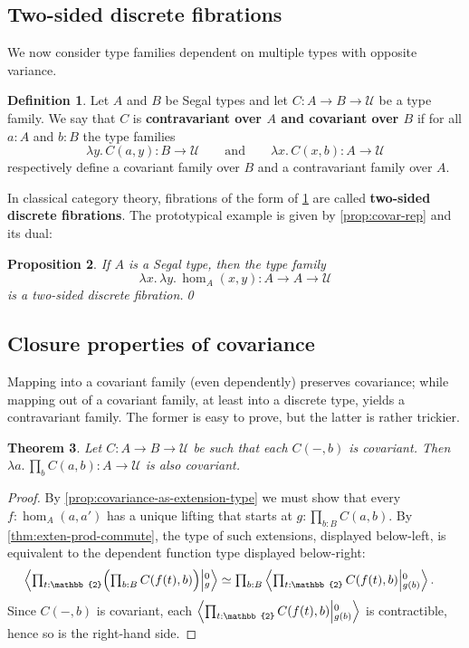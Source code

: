 \documentclass{amsart}
\theoremstyle{plain}
\newtheorem{thm}{Theorem}[section]
\newtheorem{prop}[thm]{Proposition}
\theoremstyle{definition}
\newtheorem{defn}[thm]{Definition}
\theoremstyle{remark}
\numberwithin{equation}{section}
\newcommand{\tprod}{\textstyle\prod}
\newcommand{\exten}[4]{\left\langle\mathchoice{\textstyle\prod_{#1}}{\textstyle\prod_{#1}}{\scriptstyle\prod_{#1}}{\scriptscriptstyle\prod_{#1}} #2 \middle|^{#3}_{#4}\right\rangle}
\newcommand{\univtype}{\mathcal{U}}
\newcommand{\lam}[1]{\lambda #1.\,}
\newcommand{\two}{\mathbb{2}}
\newcommand{\Parens}[1]{\Bigl(#1\Bigr)}
\begin{document}
\subsection{Two-sided discrete fibrations}

We now consider type families dependent on multiple types with opposite variance.

\begin{defn}\label{defn:two-sided-discrete}
  Let $A$ and $B$ be Segal types and let $C : A \to B \to \univtype$ be a type family. We say that $C$ is \textbf{contravariant over $A$ and covariant over $B$} if for all $a : A$ and $b : B$ the type families
  \[ \lam{y}C(a,y) : B \to \univtype \qquad \mathrm{and} \qquad \lam{x}C(x,b) : A \to \univtype\] respectively define a covariant family over $B$ and a contravariant family over $A$.
\end{defn}

In classical category theory, fibrations of the form of \cref{defn:two-sided-discrete} are called \textbf{two-sided discrete fibrations}. The prototypical example is given by \cref{prop:covar-rep} and its dual:

\begin{prop}\label{prop:hom-bifunctor}
If $A$ is a Segal type, then the type family
\[ \lam{x}\lam{y} \hom_A(x,y) : A \to A \to \univtype\] is a two-sided discrete fibration.\qed
\end{prop}

\subsection{Closure properties of covariance}
\label{sec:closure-of-covariance}

Mapping into a covariant family (even dependently) preserves covariance; while mapping out of a covariant family, at least into a discrete type, yields a contravariant family.
The former is easy to prove, but the latter is rather trickier.

\begin{thm}\label{thm:prod-covar}
  Let $C:A\to B\to \univtype$ be such that each $C(-,b)$ is covariant.
  Then $\lam{a} \prod_b C(a,b) : A \to \univtype$ is also covariant.
\end{thm}
\begin{proof}
  By \cref{prop:covariance-as-extension-type} we must show that every $f:\hom_A(a,a')$ has a unique lifting that starts at $g:\prod_{b:B} C(a,b)$. By \cref{thm:exten-prod-commute}, the type of such extensions, displayed below-left, is equivalent to the dependent function type displayed below-right:
  \begin{align*}
    \exten{t:\two}{\Parens{\tprod_{b:B} C(f(t),b)}}{0}{g}
    &\simeq \tprod_{b:B} \exten{t:\two}{C(f(t),b)}{0}{g(b)}.
  \end{align*}
  Since $C(-,b)$ is covariant, each $\exten{t:\two}{C(f(t),b)}{0}{g(b)}$ is contractible, hence so is the right-hand side.
\end{proof}
\end{document}
